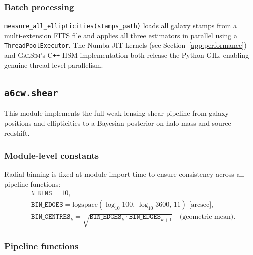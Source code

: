 \subsubsection*{Batch processing}

\texttt{measure\_all\_ellipticities(stamps\_path)} loads all galaxy stamps
from a multi-extension FITS file and applies all three estimators in parallel
using a \texttt{ThreadPoolExecutor}. The Numba JIT kernels (see
Section~\ref{app:performance}) and \textsc{GalSim}'s C\texttt{++} HSM
implementation both release the Python GIL, enabling genuine thread-level
parallelism.

\subsection{\texttt{a6cw.shear}}
\label{app:shear}

This module implements the full weak-lensing shear pipeline from galaxy
positions and ellipticities to a Bayesian posterior on halo mass and source
redshift.

\subsubsection*{Module-level constants}

Radial binning is fixed at module import time to ensure consistency across all
pipeline functions:
\begin{align*}
    &\texttt{N\_BINS} = 10, \\
    &\texttt{BIN\_EDGES} = \mathrm{logspace}(\log_{10}100,\, \log_{10}3600,\, 11)
      \text{ [arcsec]}, \\
    &\texttt{BIN\_CENTRES}_k = \sqrt{\texttt{BIN\_EDGES}_k \cdot \texttt{BIN\_EDGES}_{k+1}}
      \quad\text{(geometric mean)}.
\end{align*}

\subsubsection*{Pipeline functions}

